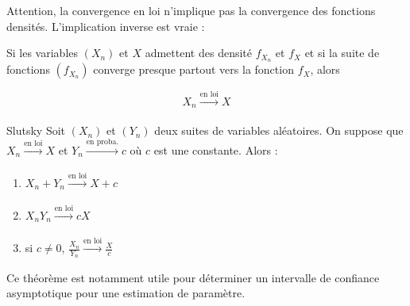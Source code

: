 Attention, la convergence en loi n'implique pas la convergence des fonctions densités. L'implication inverse est vraie :

\begin{proposition}{}{}
	Si  les variables $(X_n)$ et $X$ admettent des densité $f_{X_n}$ et $f_X$ et si la suite de fonctions $(f_{X_n})$ converge presque partout vers la fonction $f_X$, alors 
	
	$$ X_n \xrightarrow[]{\text{en loi}}X$$
\end{proposition}

\begin{theoreme}{Slutsky}{}
	Soit $(X_n)$ et $(Y_n)$ deux suites de variables aléatoires. On suppose que $X_n \xrightarrow[]{\text{en loi}}X$ et $Y_n \xrightarrow[]{\text{en proba.}}c$ où $c$ est une constante. Alors :
	\begin{enumerate}
		\item $X_n+Y_n \xrightarrow[]{\text{en loi}}X+c$
		\item $X_nY_n \xrightarrow[]{\text{en loi}}cX$
		\item si $c \neq 0$, $\frac{X_n}{Y_n} \xrightarrow[]{\text{en loi}}\frac{X}{c}$
	\end{enumerate}
\end{theoreme}

Ce théorème est notamment utile pour déterminer un intervalle de confiance asymptotique pour une estimation de paramètre. 
		
